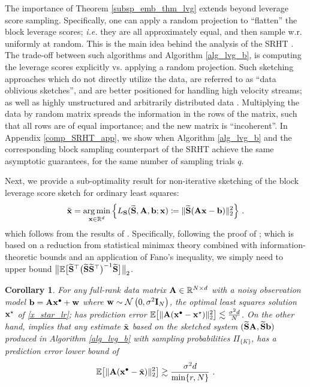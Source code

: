 \documentclass[journal,letterpaper,onecolumn,twoside,nofonttune]{IEEEtran}
\newcommand{\R}{\mathbb{R}}
\newcommand{\E}{\mathbb{E}}
\newcommand{\Nn}{\mathcal{N}}
\newcommand{\bb}{\bold{b}}
\newcommand{\xb}{\bold{x}}
\newcommand{\xbt}{\tilde{\xb}}
\newcommand{\Ab}{\bold{A}}
\newcommand{\Ib}{\bold{I}}
\newcommand{\Sb}{\bold{S}}
\newcommand{\Sbwt}{\widetilde{\Sb}}
\newcommand{\wb}{\bold{w}}
\newtheorem{Cor}{Corollary}
\DeclareMathOperator*{\argmin}{arg\,min}
\begin{document}
The importance of Theorem \ref{subsp_emb_thm_lvg} extends beyond leverage score sampling. Specifically, one can apply a random projection to ``flatten'' the block leverage scores; \textit{i.e.} they are all approximately equal, and then sample w.r. uniformly at random. This is the main idea behind the analysis of the SRHT \cite{AC06,AC09}. The trade-off between such algorithms and Algorithm \ref{alg_lvg_b}, is computing the leverage scores explicitly vs. applying a random projection. Such sketching approaches which do not directly utilize the data, are referred to as ``data oblivious sketches'', and are better positioned for handling high velocity streams; as well as highly unstructured and arbitrarily distributed data \cite{MOW21}. Multiplying the data by random matrix spreads the information in the rows of the matrix, such that all rows are of equal importance; and the new matrix is ``incoherent''. In Appendix \ref{comp_SRHT_app}, we show when Algorithm \ref{alg_lvg_b} and the corresponding block sampling counterpart of the SRHT \cite{CMPH22} achieve the same asymptotic guarantees, for the same number of sampling trials $q$.

Next, we provide a sub-optimality result for non-iterative sketching of the block leverage score sketch for ordinary least squares:
\begin{equation}
\label{nonit_OLS}
  \xbt = \argmin_{\xb\in\R^d} \Big\{L_\Sb(\Sbwt,\Ab,\bb;\xb)\coloneqq\|\Sbwt(\Ab\xb-\bb)\|_2^2\Big\}\ .
\end{equation}
which follows from the results of \cite{PW16}. Specifically, following the proof of {\cite[Theorem 1]{PW16}}; which is based on a reduction from statistical minimax theory combined with information-theoretic bounds and an application of Fano’s inequality, we simply need to upper bound $\big\|\E\big[\Sbwt^\top\big(\Sbwt\Sbwt^\top\big)^{-1}\Sbwt\big]\big\|_2$. %

\begin{Cor}
\label{sub_opt_cor}
For any full-rank data matrix $\Ab\in\R^{N\times d}$ with a noisy observation model $\bb=\Ab\xb^\bullet+\wb$ where $\wb\sim\Nn\left(0,\sigma^2\Ib_N\right)$, the optimal least squares solution $\xb^\star$ of \eqref{x_star_lr}; has prediction error $\E\big[\|\Ab(\xb^\bullet-\xb^\star)\|_2^2\big]\lesssim\frac{\sigma^2d}{N}$. On the other hand, {\cite[Theorem 1]{PW16}} implies that any estimate $\xbt$ based on the sketched system $(\Sbwt\Ab,\Sbwt\bb)$ produced in Algorithm \ref{alg_lvg_b} with sampling probabilities $\Pi_{\{K\}}$, has a prediction error lower bound of
\begin{equation}
\label{sub_opt_error}
  \E\big[\|\Ab(\xb^\bullet-\xbt)\|_2^2\big]\gtrsim\frac{\sigma^2d}{\min\{r,N\}}\ .
\end{equation}
\end{Cor}
\end{document}
